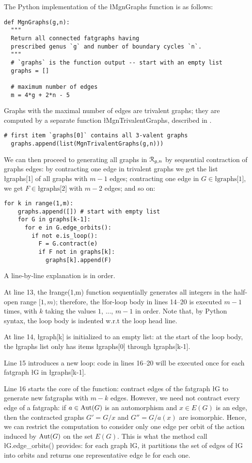 The Python implementation of the \l{MgnGraphs} function is as follows:
\begin{lstlisting}[name=MgnGraphs,firstnumber=1]
def MgnGraphs(g,n):
  """
  Return all connected fatgraphs having
  prescribed genus `g` and number of boundary cycles `n`.
  """
  # `graphs` is the function output -- start with an empty list
  graphs = []

  # maximum number of edges
  m = 4*g + 2*n - 5
\end{lstlisting}
Graphs with the maximal number of edges are trivalent graphs; they are
computed by a separate function \l{MgnTrivalentGraphs}, described in
.
\begin{lstlisting}[name=MgnGraphs,firstnumber=11]
  # first item `graphs[0]` contains all 3-valent graphs
  graphs.append(list(MgnTrivalentGraphs(g,n)))
\end{lstlisting}
We can then proceed to generating all graphs in $\mathcal{R}_{g,n}$ by
sequential contraction of graphs edges: by contracting one edge in
trivalent graphs we get the list \l{graphs[1]} of all graphs with
$m-1$ edges; contracting one edge in $G \in \text{\l{graphs[1]}}$, we
get $F \in \text{\l{graphs[2]}}$ with $m-2$ edges; and so on:
\begin{lstlisting}[name=MgnGraphs,firstnumber=13]
  for k in range(1,m):
    graphs.append([]) # start with empty list
    for G in graphs[k-1]:
      for e in G.edge_orbits():
        if not e.is_loop():
          F = G.contract(e)
          if F not in graphs[k]:
            graphs[k].append(F)
\end{lstlisting}
A line-by-line explanation is in order.

At line 13, the \l{range(1,m)} function sequentially generates all
integers in the half-open range $[1, m)$; therefore, the \l{for}-loop
body in lines 14--20 is executed $m-1$ times, with $k$ taking the
values $1$, ..., $m-1$ in order.  Note that, by Python syntax, the
loop body is indented w.r.t the loop head line.

At line 14, \l{graph[k]} is initialized to an empty list: at the start
of the loop body, the \l{graphs} list only has items \l{graphs[0]}
through \l{graphs[k-1]}.

Line 15 introduces a new loop: code in lines 16--20 will be executed
once for each fatgraph \l{G} in \l{graphs[k-1]}.

Line 16 starts the core of the function: contract edges of the
fatgraph \l{G} to generate new fatgraphs with $m-k$ edges.  However,
we need not contract every edge of a fatgraph: if $a \in \operatorname{Aut}(G)$ is
an automorphism and $x \in E(G)$ is an edge, then the contracted
graphs $G' = G/x$ and $G'' = G/a(x)$ are isomorphic.  Hence, we can
restrict the computation to consider only one edge per orbit of the
action induced by $\operatorname{Aut}(G)$ on the set $E(G)$. This is what the method
call \l{G.edge_orbits()} provides: for each graph \l{G}, it partitions
the set of edges of \l{G} into orbits and returns one representative
edge \l{e} for each one.

